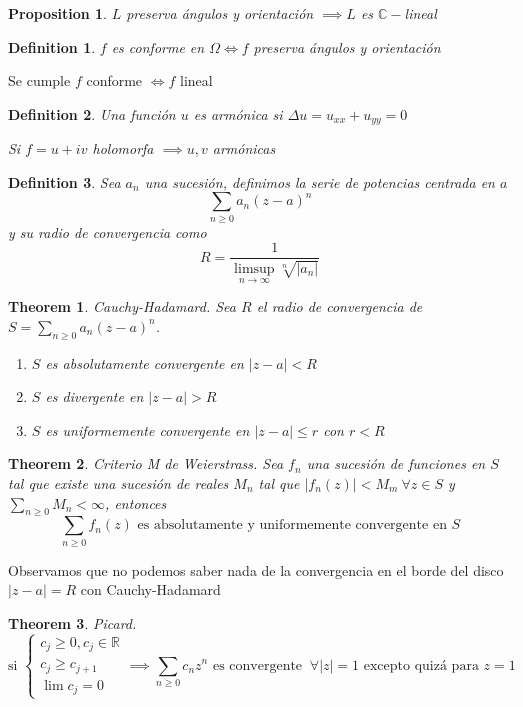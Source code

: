 \documentclass[leqno]{article}
\newtheorem*{definition}{Definition}
\newtheorem*{theorem}{Theorem}
\newtheorem*{proposition}{Proposition}
\begin{document}
\begin{proposition}
$L$ preserva ángulos y orientación $\implies L $ es $\mathbb{C}-$lineal
\end{proposition}

\begin{definition}
$f$ es conforme en $\Omega \iff f$ preserva ángulos y orientación
\end{definition}

Se cumple $f$ conforme  $\iff f$ lineal

\begin{definition}
Una función $u$ es armónica si $\Delta u = u_{x x} + u_{yy} = 0$ 

Si $f = u + iv$ holomorfa  $\implies u, v$ armónicas
\end{definition}

\begin{definition}
Sea $a_n$ una sucesión, definimos la serie de potencias centrada en $a$
\[
\sum_{n\ge 0} a_n(z-a)^n
\] 
y su radio de convergencia como
\[
R = \frac{1}{\limsup_{n\to \infty} \sqrt[n]{|a_n|} }
\] 
\end{definition}

\begin{theorem}
Cauchy-Hadamard. Sea $R$ el radio de convergencia de  $S = \sum_{n\ge 0} a_n (z-a)^n$.
\begin{enumerate}[topsep=0pt, itemsep=0pt]
  \item $S$ es absolutamente convergente en  $|z-a|<R$ 
  \item $S$ es divergente en  $|z-a|>R$ 
  \item $S$ es uniformemente convergente en $|z-a|\le r$ con $r<R$
\end{enumerate}
\end{theorem}

\begin{theorem}
Criterio M de Weierstrass. Sea $f_n$ una sucesión de funciones en $S$ tal que existe una sucesión de reales  $M_n$ tal que  $|f_n(z)|<M_m \ \forall z\in S$  y $\sum_{n\ge 0} M_n<\infty$, entonces
\[
\sum_{n\ge 0} f_n(z) \text{ es absolutamente y uniformemente convergente en } S
\] 
\end{theorem}

Observamos que no podemos saber nada de la convergencia en el borde del disco $|z-a|=R$ con Cauchy-Hadamard

\begin{theorem}
Picard. 
\[
\text{si } \begin{cases}
  c_j\ge 0, c_j\in \mathbb{R} \\
  c_j\ge c_{j+1} \\
  \lim c_j = 0
\end{cases}
\implies \sum_{n\ge 0} c_nz^n \text{ es convergente } \ \forall |z|=1 \text{ excepto quizá para } z=1
\] 
\end{theorem}
\end{document}

